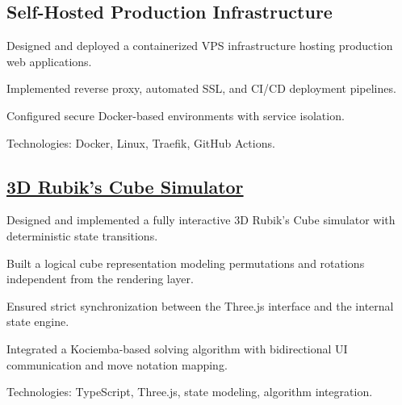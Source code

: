 \subsection{{Self-Hosted Production Infrastructure}}

\begin{zitemize}
    \item Designed and deployed a containerized VPS infrastructure hosting production web applications.
    \item Implemented reverse proxy, automated SSL, and CI/CD deployment pipelines.
    \item Configured secure Docker-based environments with service isolation.
    \item Technologies: Docker, Linux, Traefik, GitHub Actions.
\end{zitemize}

\vspace{6pt}

\subsection{\href{https://rubikscube.gregoirelorgnier.me/}{3D Rubik’s Cube Simulator}}

\begin{zitemize}
    \item Designed and implemented a fully interactive 3D Rubik’s Cube simulator with deterministic state transitions.
    \item Built a logical cube representation modeling permutations and rotations independent from the rendering layer.
    \item Ensured strict synchronization between the Three.js interface and the internal state engine.
    \item Integrated a Kociemba-based solving algorithm with bidirectional UI communication and move notation mapping.
    \item Technologies: TypeScript, Three.js, state modeling, algorithm integration.
\end{zitemize}

